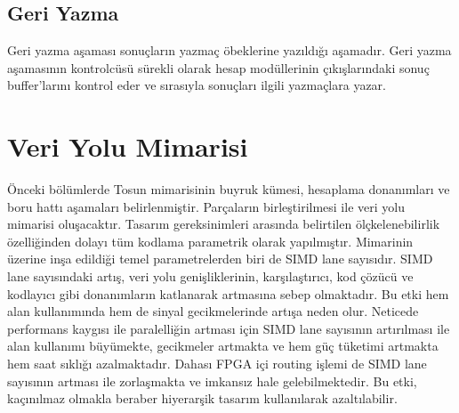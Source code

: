 \subsection{Geri Yazma}
Geri yazma aşaması sonuçların yazmaç öbeklerine yazıldığı aşamadır. Geri yazma aşamasının kontrolcüsü sürekli olarak hesap modüllerinin çıkışlarındaki sonuç buffer'larını kontrol eder ve sırasıyla sonuçları ilgili yazmaçlara yazar.

\section{Veri Yolu Mimarisi }
Önceki bölümlerde Tosun mimarisinin buyruk kümesi, hesaplama donanımları ve boru hattı aşamaları belirlenmiştir. Parçaların birleştirilmesi ile veri yolu mimarisi oluşacaktır. Tasarım gereksinimleri arasında belirtilen ölçkelenebilirlik özelliğinden dolayı tüm kodlama parametrik olarak yapılmıştır. Mimarinin üzerine inşa edildiği temel parametrelerden biri de SIMD lane sayısıdır. SIMD lane sayısındaki artış, veri yolu genişliklerinin, karşılaştırıcı, kod çözücü ve kodlayıcı gibi donanımların katlanarak artmasına sebep olmaktadır. Bu etki hem alan kullanımında hem de sinyal gecikmelerinde artışa neden olur. Neticede performans kaygısı ile paralelliğin artması için SIMD lane sayısının artırılması ile alan kullanımı büyümekte, gecikmeler artmakta ve hem güç tüketimi artmakta hem saat sıklığı azalmaktadır. Dahası FPGA içi routing işlemi de SIMD lane sayısının artması ile zorlaşmakta ve imkansız hale gelebilmektedir. Bu etki, kaçınılmaz olmakla beraber hiyerarşik tasarım kullanılarak azaltılabilir.\par 

